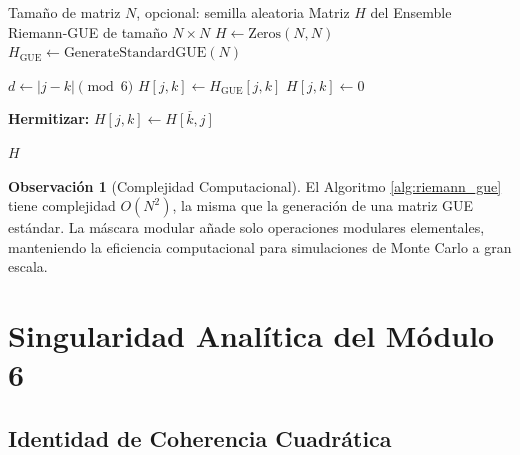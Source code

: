 \documentclass[12pt, a4paper]{article}
\theoremstyle{plain}
\theoremstyle{definition}
\newtheorem{observacion}[teorema]{Observación}
\theoremstyle{remark}
\begin{document}
\begin{algorithm}[H]
\caption{Generación del Ensemble Riemann-GUE (Versión Base)}
\label{alg:riemann_gue}
\begin{algorithmic}[1]
\Require Tamaño de matriz $N$, opcional: semilla aleatoria
\Ensure Matriz $H$ del Ensemble Riemann-GUE de tamaño $N \times N$
    \State $H \gets \text{Zeros}(N, N)$ 
    \State $H_{\text{GUE}} \gets \text{GenerateStandardGUE}(N)$ 
    
         
            \State $d \gets |j - k| \pmod 6$ 
             
                \State $H[j, k] \gets H_{\text{GUE}}[j, k]$ 
            \Else
                \State $H[j, k] \gets 0$ 
            \EndIf
        \EndFor
    \EndFor
    
    \State \textbf{Hermitizar:} 
            \State $H[j, k] \gets \overline{H[k, j]}$ 
        \EndFor
    \EndFor
    
    \State \Return $H$
\EndFunction
\end{algorithmic}
\end{algorithm}

\begin{observacion}[Complejidad Computacional]
El Algoritmo \ref{alg:riemann_gue} tiene complejidad $O(N^2)$, la misma que la generación de una matriz GUE estándar. La máscara modular añade solo operaciones modulares elementales, manteniendo la eficiencia computacional para simulaciones de Monte Carlo a gran escala.
\end{observacion}

\section{Singularidad Analítica del Módulo 6}
\label{sec:singularidad_modulo6}

\subsection{Identidad de Coherencia Cuadrática}
\label{subsec:identidad_cuadratica}
\end{document}
